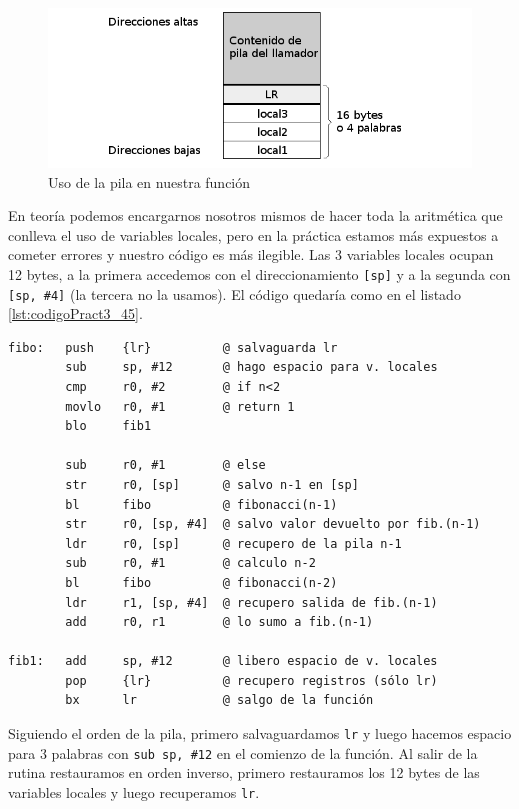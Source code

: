 \begin{figure}[h]
  \centering
    \includegraphics[width=14cm]{graphs/pila2.png}
  \caption{Uso de la pila en nuestra función}
  \label{fig:pila2}
\end{figure}

En teoría podemos encargarnos nosotros mismos de hacer toda la aritmética que conlleva el
uso de variables locales, pero en la práctica estamos más expuestos a cometer errores y
nuestro código es más ilegible. Las 3 variables locales ocupan 12 bytes, a la primera
accedemos con el direccionamiento {\tt [sp]} y a la segunda con {\tt [sp, \#4]} (la tercera
no la usamos). El código quedaría como en el listado \ref{lst:codigoPract3_45}.

\newpage
\begin{lstlisting}[caption={Función recursiva fibo (en subrut3.s)},label={lst:codigoPract3_45}]
fibo:   push    {lr}          @ salvaguarda lr
        sub     sp, #12       @ hago espacio para v. locales
        cmp     r0, #2        @ if n<2
        movlo   r0, #1        @ return 1
        blo     fib1

        sub     r0, #1        @ else
        str     r0, [sp]      @ salvo n-1 en [sp]
        bl      fibo          @ fibonacci(n-1)
        str     r0, [sp, #4]  @ salvo valor devuelto por fib.(n-1)
        ldr     r0, [sp]      @ recupero de la pila n-1
        sub     r0, #1        @ calculo n-2
        bl      fibo          @ fibonacci(n-2)
        ldr     r1, [sp, #4]  @ recupero salida de fib.(n-1)
        add     r0, r1        @ lo sumo a fib.(n-1)

fib1:   add     sp, #12       @ libero espacio de v. locales
        pop     {lr}          @ recupero registros (sólo lr)
        bx      lr            @ salgo de la función
\end{lstlisting}

Siguiendo el orden de la pila, primero salvaguardamos {\tt lr} y luego hacemos espacio para
3 palabras con {\tt sub sp, \#12} en el comienzo de la función. Al salir de la rutina
restauramos en orden inverso, primero restauramos los 12 bytes de las variables locales
y luego recuperamos {\tt lr}.

